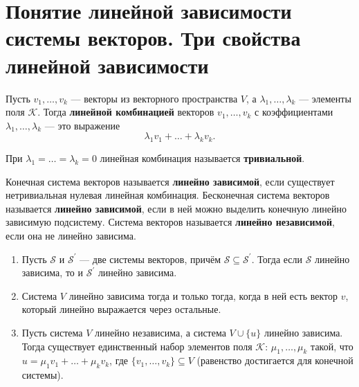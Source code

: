 \section{Понятие линейной зависимости системы векторов. Три свойства линейной зависимости}

\begin{definition}
    Пусть $v_1, \ldots, v_k$ --- векторы из векторного пространства $V$, а $\lambda_1, \ldots, \lambda_k$ --- элементы поля $\mathcal{K}$. Тогда \textbf{линейной комбинацией} векторов $v_1, \ldots, v_k$ с коэффициентами $\lambda_1, \ldots, \lambda_k$ --- это выражение
    $$
    \lambda_1v_1 + \ldots + \lambda_kv_k.
    $$

    При $\lambda_1 = \ldots = \lambda_k = 0$ линейная комбинация называется \textbf{тривиальной}.
\end{definition}

\begin{definition}
    Конечная система векторов называется \textbf{линейно зависимой}, если существует нетривиальная нулевая линейная комбинация. Бесконечная система векторов называется \textbf{линейно зависимой}, если в ней можно выделить конечную линейно зависимую подсистему. Система векторов называется \textbf{линейно независимой}, если она не линейно зависима.
\end{definition}

\begin{theorem}
    \begin{enumerate}[nolistsep]
        \item Пусть $\mathcal{S}$ и $\mathcal{S}^\prime$ --- две системы векторов, причём $\mathcal{S} \subseteq \mathcal{S}^\prime$. Тогда если $\mathcal{S}$ линейно зависима, то и $\mathcal{S}^\prime$ линейно зависима.
        \item Система $V$ линейно зависима тогда и только тогда, когда в ней есть вектор $v$, который линейно выражается через остальные.
        \item Пусть система $V$ линейно независима, а система $V \cup \{u\}$ линейно зависима. Тогда существует единственный набор элементов поля $\mathcal{K}$: $\mu_1, \ldots, \mu_k$ такой, что $u = \mu_1v_1 + \ldots + \mu_kv_k$, где $\{v_1, \ldots, v_k\} \subseteq V$ (равенство достигается для конечной системы).
    \end{enumerate}
\end{theorem}

